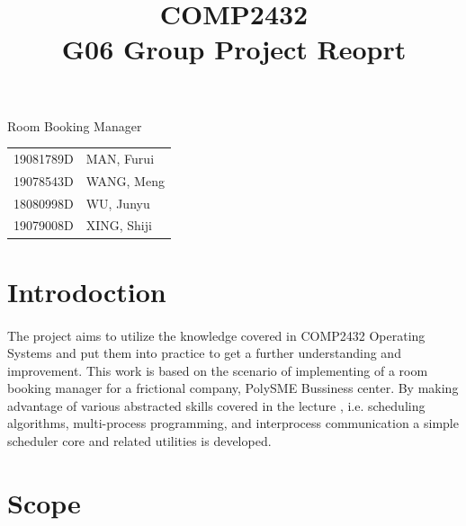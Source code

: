 \documentclass{article}
\title{\begin{center}\Huge COMP2432\\
    G06 Group Project Reoprt\end{center}}
\date{}
\author{}
\begin{document}
    \begin{titlepage}
        \maketitle
        \begin{center}
            \huge Room Booking Manager
            \vfill
            \begin{table}[!htbp]
                \centering
                \huge
                \begin{tabular}{ll}
                    19081789D\hspace{0.25in}&MAN, Furui \\
                    19078543D\hspace{0.25in}&WANG, Meng \\
                    18080998D\hspace{0.25in}&WU, Junyu  \\
                    19079008D\hspace{0.25in}&XING, Shiji\\
                \end{tabular}
            \end{table}
            \vspace{0.5in}
            \thispagestyle{empty}
        \end{center}
    \end{titlepage}
    \cleardoublepage
    \tableofcontents
    \thispagestyle{empty}
    \cleardoublepage
    \setcounter{page}{1}
    \section{Introdoction}
        \paragraph{}
        The project aims to utilize the knowledge covered in COMP2432 Operating Systems
        and put them into practice to get a further understanding and improvement. 
        This work is based on the scenario of implementing of a room booking manager
        for a frictional company, PolySME Bussiness center. By making advantage of
        various abstracted skills covered in the lecture , i.e. scheduling algorithms,
        multi-process programming, and interprocess communication a simple scheduler
        core and related utilities is developed.
    \cleardoublepage
    \section{Scope}
\end{document}
